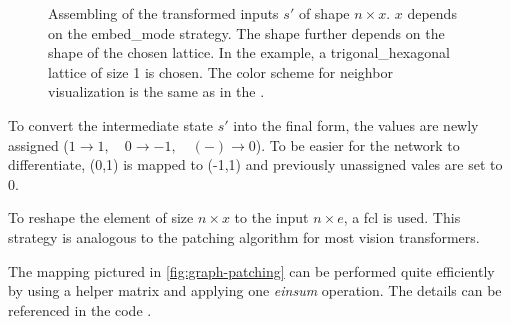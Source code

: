 \begin{figure}[htbp]
    \centering
    \caption{Assembling of the transformed inputs $s'$ of shape $n\times x$. $x$ depends on the embed\_mode strategy.
                The shape further depends on the shape of the chosen lattice. 
                In the example, a trigonal\_hexagonal lattice of size 1 is chosen.
                The color scheme for neighbor visualization is the same as in the .}
    \label{fig:graph-patching}
\end{figure}

To convert the intermediate state $s'$ into the final form, the values are newly assigned
($1 \rightarrow 1,\quad 0\rightarrow -1,\quad (-) \rightarrow 0$). 
To be easier for the network to differentiate, (0,1) is mapped to (-1,1) and previously unassigned vales are set to 0.

To reshape the element of size $n \times x$ to the input $n\times e$, a fcl is used.
This strategy is analogous to the patching algorithm for most vision transformers.

The mapping pictured in \autoref{fig:graph-patching} can be performed quite efficiently by using a helper matrix and applying one \emph{einsum} operation.  
The details can be referenced in the code \cite{selfPhysics}.


